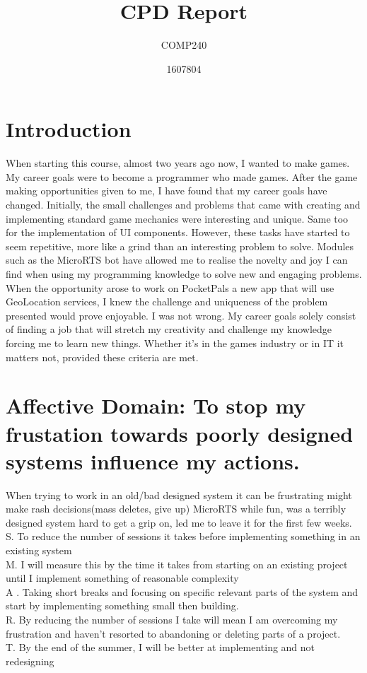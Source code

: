 \documentclass{scrartcl}
\title{CPD Report}
\subtitle{COMP240}
\author{1607804}
\begin{document}
\maketitle

\section{Introduction}
When starting this course, almost two years ago now, I wanted to make games. My career goals were to become a programmer who made games. After the game making opportunities given to me, I have found that my career goals have changed. Initially, the small challenges and problems that came with creating and implementing standard game mechanics were interesting and unique. Same too for the implementation of UI components. However, these tasks have started to seem repetitive, more like a grind than an interesting problem to solve. Modules such as the MicroRTS bot have allowed me to realise the novelty and joy I can find when using my programming knowledge to solve new and engaging problems. When the opportunity arose to work on PocketPals a new app that will use GeoLocation services, I knew the challenge and uniqueness of the problem presented would prove enjoyable. I was not wrong. My career goals solely consist of finding a job that will stretch my creativity and challenge my knowledge forcing me to learn new things. Whether it's in the games industry or in IT it matters not, provided these criteria are met.

\section{Affective Domain: To stop my frustation towards poorly designed systems influence my actions.}
When trying to work in an old/bad designed system it can be frustrating might make rash decisions(mass deletes, give up)
MicroRTS while fun, was a terribly designed system hard to get a grip on, led me to leave it for the first few weeks.\\
S.    To reduce the number of sessions it takes before implementing something in an existing system \\
M.   I will measure this by the time it takes from starting on an existing project until I implement something of reasonable complexity\\
A .  Taking short breaks and focusing on specific relevant parts of the system and start by implementing something small then building.\\
R.   By reducing the number of sessions I take will mean I am overcoming my frustration and haven't resorted to abandoning or deleting parts of a project.\\
T.   By the end of the summer, I will be better at implementing and not redesigning \\
\end{document}
